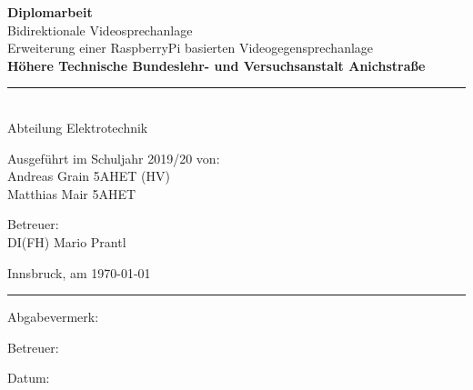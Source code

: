 \begin{center}
	\vspace*{2cm}
	\Huge\textbf{Diplomarbeit}\\
	\vspace*{2cm}
	\huge Bidirektionale Videosprechanlage\\
	\vspace*{0.5cm}
	\normalsize Erweiterung einer RaspberryPi basierten Videogegensprechanlage\\
	\vspace*{1.5cm}
	\textbf{Höhere Technische Bundeslehr- und Versuchsanstalt Anichstraße}\\
	\vspace*{0.5cm}
	\rule{0.75\linewidth}{0.4pt}\\
	\vspace*{0.5cm}
	Abteilung Elektrotechnik\\
	\vspace*{1cm}
	\begin{minipage}{0.425\linewidth}
		\begin{flushleft}
			Ausgeführt im Schuljahr 2019/20 von:\bigskip\\
			Andreas Grain 5AHET (HV)\\
			Matthias Mair 5AHET\\
		\end{flushleft}
	\end{minipage}
	\begin{minipage}{0.425\linewidth}
		\begin{flushright}
			Betreuer:\bigskip\\
			DI(FH) Mario Prantl\\
		\end{flushright}
	\end{minipage}
\end{center}
\vspace*{1cm}
\vfill
Innsbruck, am \today
\vspace*{1cm}
\hrule
\vspace*{1cm}
\noindent\begin{minipage}{0.495\linewidth}
	Abgabevermerk:	
\end{minipage}
\noindent\begin{minipage}{0.495\linewidth}
	Betreuer:	
\end{minipage}
\begin{flushleft}
	Datum:
\end{flushleft}
\restoregeometry